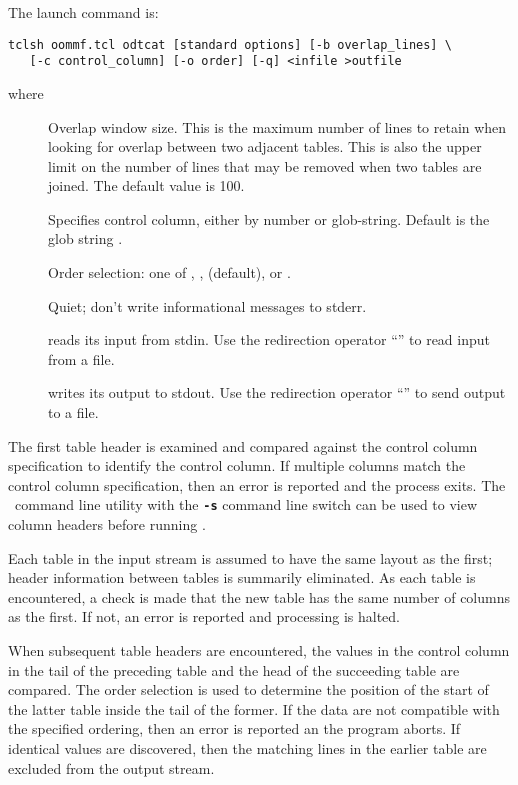 The  launch command is:
\begin{verbatim}
tclsh oommf.tcl odtcat [standard options] [-b overlap_lines] \
   [-c control_column] [-o order] [-q] <infile >outfile
\end{verbatim}
where
\begin{description}
\item[]
  Overlap window size.  This is the maximum number of lines to retain
  when looking for overlap between two adjacent tables.  This is also
  the upper limit on the number of lines that may be removed when
  two tables are joined.  The default value is 100.
\item[]
  Specifies control column, either by number or glob-string.  Default
  is the glob string
  .
\item[\optkey{-o order}]
  Order selection: one of , , 
  (default), or \cd{none}.
\item[]
  Quiet; don't write informational messages to stderr.
\item[]
   reads its input from stdin.  Use the redirection operator
  ``\boa'' to read input from a file.
\item[]
   writes its output to stdout.  Use the redirection operator
  ``\bca'' to send output to a file.
\end{description}
The first table header is examined and compared against the control
column specification to identify the control column.  If multiple
columns match the control column specification, then an error is
reported and the process exits.  The \OOMMF\ command line utility
{}
with the \texttt{\textbf{-s}} command line switch can be used to view
column headers before running \app{odtcat}.

Each table in the input stream is assumed to have the same layout as
the first; header information between tables is summarily eliminated.
As each table is encountered, a check is made that the new table has
the same number of columns as the first.  If not, an error is reported
and processing is halted.

When subsequent table headers are encountered, the values in the
control column in the tail of the preceding table and the head of the
succeeding table are compared.  The order selection is used to
determine the position of the start of the latter table inside the
tail of the former.  If the data are not compatible with the specified
ordering, then an error is reported an the program aborts.  If
identical values are discovered, then the matching lines in the
earlier table are excluded from the output stream.

